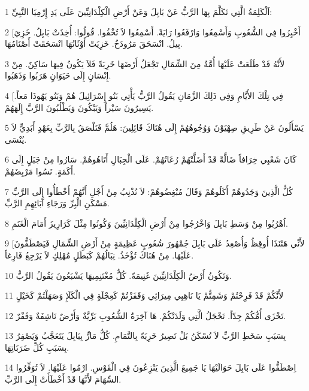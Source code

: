 \par 1 اَلْكَلِمَةُ الَّتِي تَكَلَّمَ بِهَا الرَّبُّ عَنْ بَابِلَ وَعَنْ أَرْضِ الْكِلْدَانِيِّينَ عَلَى يَدِ إِرْمِيَا النَّبِيِّ:
\par 2 [أَخْبِرُوا فِي الشُّعُوبِ وَأَسْمِعُوا وَارْفَعُوا رَايَةً. أَسْمِعُوا لاَ تُخْفُوا. قُولُوا: أُخِذَتْ بَابِلُ. خَزِيَ بِيلُ. انْسَحَقَ مَرُودَخُ. خَزِيَتْ أَوْثَانُهَا انْسَحَقَتْ أَصْنَامُهَا.
\par 3 لأَنَّهُ قَدْ طَلَعَتْ عَلَيْهَا أُمَّةٌ مِنَ الشِّمَالِ تَجْعَلُ أَرْضَهَا خَرِبَةً فَلاَ يَكُونُ فِيهَا سَاكِنٌ. مِنْ إِنْسَانٍ إِلَى حَيَوَانٍ هَرَبُوا وَذَهَبُوا.
\par 4 [فِي تِلْكَ الأَيَّامِ وَفِي ذَلِكَ الزَّمَانِ يَقُولُ الرَّبُّ يَأْتِي بَنُو إِسْرَائِيلَ هُمْ وَبَنُو يَهُوذَا مَعاً. يَسِيرُونَ سَيْراً وَيَبْكُونَ وَيَطْلُبُونَ الرَّبَّ إِلَهَهُمْ.
\par 5 يَسْأَلُونَ عَنْ طَرِيقِ صِهْيَوْنَ وَوُجُوهُهُمْ إِلَى هُنَاكَ قَائِلِينَ: هَلُمَّ فَنَلْصَقُ بِالرَّبِّ بِعَهْدٍ أَبَدِيٍّ لاَ يُنْسَى.
\par 6 كَانَ شَعْبِي خِرَافاً ضَالَّةً قَدْ أَضَلَّتْهُمْ رُعَاتُهُمْ. عَلَى الْجِبَالِ أَتَاهُوهُمْ. سَارُوا مِنْ جَبَلٍ إِلَى أَكَمَةٍ. نَسُوا مَرْبِضَهُمْ.
\par 7 كُلُّ الَّذِينَ وَجَدُوهُمْ أَكَلُوهُمْ وَقَالَ مُبْغِضُوهُمْ: لاَ نُذْنِبُ مِنْ أَجْلِ أَنَّهُمْ أَخْطَأُوا إِلَى الرَّبِّ مَسْكَنِ الْبِرِّ وَرَجَاءِ آبَائِهِمِ الرَّبِّ.
\par 8 اُهْرُبُوا مِنْ وَسَطِ بَابِلَ وَاخْرُجُوا مِنْ أَرْضِ الْكِلْدَانِيِّينَ وَكُونُوا مِثْلَ كَرَارِيزَ أَمَامَ الْغَنَمِ.
\par 9 [لأَنِّي هَئَنَذَا أُوقِظُ وَأُصْعِدُ عَلَى بَابِلَ جُمْهُورَ شُعُوبٍ عَظِيمَةٍ مِنْ أَرْضِ الشِّمَالِ فَيَصْطَفُّونَ عَلَيْهَا. مِنْ هُنَاكَ تُؤْخَذُ. نِبَالُهُمْ كَبَطَلٍ مُهْلِكٍ لاَ يَرْجِعُ فَارِغاً.
\par 10 وَتَكُونُ أَرْضُ الْكِلْدَانِيِّينَ غَنِيمَةً. كُلُّ مُغْتَنِمِيهَا يَشْبَعُونَ يَقُولُ الرَّبُّ.
\par 11 لأَنَّكُمْ قَدْ فَرِحْتُمْ وَشَمِتُّمْ يَا نَاهِبِي مِيرَاثِي وَقَفَزْتُمْ كَعِجْلَةٍ فِي الْكَلَإِ وَصَهَلْتُمْ كَخَيْلٍ
\par 12 تَخْزَى أُمُّكُمْ جِدّاً. تَخْجَلُ الَّتِي وَلَدَتْكُمْ. هَا آخِرَةُ الشُّعُوبِ بَرِّيَّةٌ وَأَرْضٌ نَاشِفَةٌ وَقَفْرٌ.
\par 13 بِسَبَبِ سَخَطِ الرَّبِّ لاَ تُسْكَنُ بَلْ تَصِيرُ خَرِبَةً بِالتَّمَامِ. كُلُّ مَارٍّ بِبَابِلَ يَتَعَجَّبُ وَيَصْفِرُ بِسَبَبِ كُلِّ ضَرَبَاتِهَا.
\par 14 اِصْطَفُّوا عَلَى بَابِلَ حَوَالَيْهَا يَا جَمِيعَ الَّذِينَ يَنْزِعُونَ فِي الْقَوْسِ. ارْمُوا عَلَيْهَا. لاَ تُوَفِّرُوا السِّهَامَ لأَنَّهَا قَدْ أَخْطَأَتْ إِلَى الرَّبِّ.
